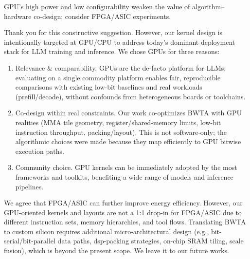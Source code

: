 \begin{revcomment}
GPU's high power and low configurability weaken the value of algorithm–hardware co-design; consider FPGA/ASIC experiments. 


\end{revcomment}
\begin{revresponse}[]

Thank you for this constructive suggestion. However, our kernel design is intentionally targeted at GPU/CPU to address today's dominant deployment stack for LLM training and inference. We chose GPUs for three reasons:
\begin{enumerate}
    \item Relevance \& comparability. GPUs are the de-facto platform for LLMs; evaluating on a single commodity platform enables fair, reproducible comparisons with existing low-bit baselines and real workloads (prefill/decode), without confounds from heterogeneous boards or toolchains.
    \item Co-design within real constraints. Our work co-optimizes BWTA with GPU realities (MMA tile geometry, register/shared-memory limits, low-bit instruction throughput, packing/layout). This is not software-only; the algorithmic choices were made because they map efficiently to GPU bitwise execution paths.  
    \item Community choice. GPU kernels can be immediately adopted by the most frameworks and toolkits, benefiting a wide range of models and inference pipelines. 
\end{enumerate}

We agree that FPGA/ASIC can further improve energy efficiency. However, our GPU-oriented kernels and layouts are not a 1:1 drop-in for FPGA/ASIC due to different instruction sets, memory hierarchies, and tool flows. Translating BWTA to custom silicon requires additional micro-architectural design (e.g., bit-serial/bit-parallel data paths, dsp-packing strategies, on-chip SRAM tiling, scale fusion), which is beyond the present scope. We leave it to our future works. 
\end{revresponse}

